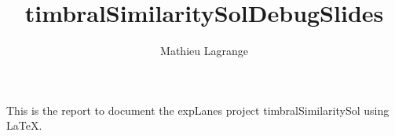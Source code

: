 \documentclass{beamer}
\title{timbralSimilaritySolDebugSlides}
\author{ Mathieu Lagrange }
\begin{document}
 
  
\maketitle 
  
  
This is the report to document the expLanes project timbralSimilaritySol using \LaTeX. 
  
  
  
 
 
  
\end{document}
